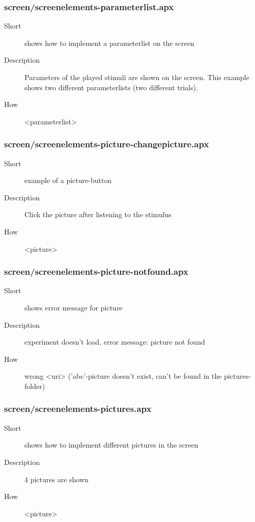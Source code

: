 \subsubsection{screen/screenelements-parameterlist.apx}
\begin{description}
\item[Short] 
 shows how to implement a parameterlist on the screen
\item[Description] 
 Parameters of the played stimuli are shown on the screen. This example shows two different parameterlists (two different trials).
\item[How] 
 \textless{}parameterlist\textgreater{}
\end{description}

\subsubsection{screen/screenelements-picture-changepicture.apx}
\begin{description}
\item[Short] 
 example of a picture-button
\item[Description] 
 Click the picture after listening to the stimulus
\item[How] 
 \textless{}picture\textgreater{}
\end{description}

\subsubsection{screen/screenelements-picture-notfound.apx}
\begin{description}
\item[Short] 
 shows error message for picture
\item[Description] 
 experiment doesn't load, error message: picture not found
\item[How] 
 wrong \textless{}uri\textgreater{} ('abc'-picture doesn't exist, can't be found in the pictures-folder)
\end{description}

\subsubsection{screen/screenelements-pictures.apx}
\begin{description}
\item[Short] 
 shows how to implement different pictures in the screen
\item[Description] 
 4 pictures are shown
\item[How] 
 \textless{}picture\textgreater{}
\end{description}

